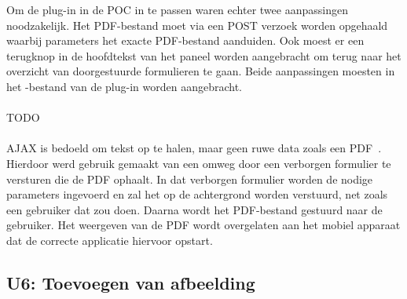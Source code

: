 Om de plug-in in de POC in te passen waren echter twee aanpassingen noodzakelijk.
Het PDF-bestand moet via een POST verzoek worden opgehaald waarbij parameters het exacte PDF-bestand aanduiden.
Ook moest er een terugknop in de hoofdtekst van het paneel worden aangebracht om terug naar het overzicht van doorgestuurde formulieren te gaan.
Beide aanpassingen moesten in het \js-bestand van de plug-in worden aangebracht.

\paragraph{\kendo}
TODO

\paragraph{\lungo}
AJAX is bedoeld om tekst op te halen, maar geen ruwe data zoals een PDF~\cite{Scott2009}. 
Hierdoor werd gebruik gemaakt van een omweg door een verborgen formulier te versturen die de PDF ophaalt.
In dat verborgen formulier worden de nodige parameters ingevoerd en zal het op de achtergrond  worden verstuurd, net zoals een gebruiker dat zou doen.
Daarna wordt het PDF-bestand gestuurd naar de gebruiker.
Het weergeven van de PDF wordt overgelaten aan het mobiel apparaat dat de correcte applicatie hiervoor opstart.

\subsection{U6: Toevoegen van afbeelding}

\paragraph{\jqm}
% 

